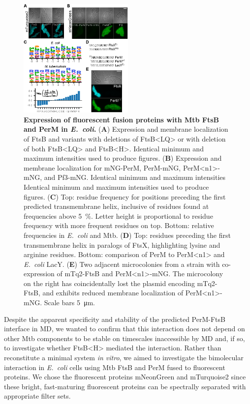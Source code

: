 \documentclass[pdflatex,sn-nature]{sn-jnl}%
\def\textsuperscript#1{<#1>}%
\newcommand\ec{\textit{E.~coli}}
\newcommand\mtb{Mtb}
\newcommand\ftsbLQ{FtsB\textsuperscript{LQ}}
\newcommand\ftsbH{FtsB\textsuperscript{H}}
\newcommand\permN{PerM\textsuperscript{n1}}
\begin{document}
\begin{figure}[t]
    \centering
    \includegraphics[width=0.5\textwidth]{./fig3.eps}
    \caption{
        \textbf{Expression of fluorescent fusion proteins with \mtb{} FtsB and PerM in \ec{}.}
        (\textbf{A}) Expression and membrane localization of FtsB and variants with deletions of \ftsbLQ{} or with deletion of both \ftsbLQ{} and \ftsbH{}. Identical minimum and maximum intensities used to produce figures.
        (\textbf{B}) Expression and membrane localization for mNG-PerM, PerM-mNG, \permN{}-mNG, and Pf3-mNG. Identical minimum and maximum intensities Identical minimum and maximum intensities used to produce figures.
        (\textbf{C}) Top: residue frequency for positions preceding the first predicted transmembrane helix, inclusive of residues found at frequencies above \qty{5}{\percent}. Letter height is proportional to residue frequency with more frequent residues on top. Bottom: relative frequencies in \ec{} and \mtb{}.
        (\textbf{D}) Top: residues preceding the first transmembrane helix in paralogs of FtsX, highlighting lysine and arginine residues. Bottom: comparison of PerM to \permN{} and \ec{} LacY.
        (\textbf{E}) Two adjacent microcolonies from a strain with co-expression of mTq2-FtsB and \permN{}-mNG. The microcolony on the right has coincidentally lost the plasmid encoding mTq2-FtsB, and exhibits reduced membrane localization of \permN{}-mNG. Scale bars \qty{5}{\um}.
    }\label{fig3}
\end{figure}

Despite the apparent specificity and stability of the predicted PerM-FtsB interface in MD, we wanted to confirm that this interaction does not depend on other \mtb{} components to be stable on timescales inaccessible by MD and, if so, to investigate whether \ftsbH{} mediated the interaction.
Rather than reconstitute a minimal system \textit{in vitro}, we aimed to investigate the bimolecular interaction in \ec{} cells using Mtb FtsB and PerM fused to fluorescent proteins.
We chose the fluorescent proteins mNeonGreen \citep{shanerBrightMonomericGreen2013} and mTurquoise2 \citep{goedhartStructureguidedEvolutionCyan2012} since these bright, fast-maturing fluorescent proteins can be spectrally separated with appropriate filter sets.
\end{document}
